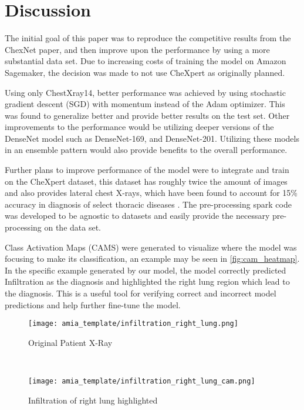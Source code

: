 \documentclass{amia}
\begin{document}
\section*{Discussion}

The initial goal of this paper was to reproduce the competitive results from the ChexNet paper, and then improve upon the performance by using a more substantial data set. Due to increasing costs of training the model on Amazon Sagemaker, the decision was made to not use CheXpert as originally planned.

Using only ChestXray14, better performance was achieved by using stochastic gradient descent (SGD) with momentum instead of the Adam optimizer. This was found to generalize better \cite{ref13} and provide better results on the test set. Other improvements to the performance would be utilizing deeper versions of the DenseNet model such as DenseNet-169, and DenseNet-201. Utilizing these models in an ensemble pattern would also provide benefits to the overall performance.

Further plans to improve performance of the model were to integrate and train on the CheXpert dataset, this dataset has roughly twice the amount of images and also provides lateral chest X-rays, which have been found to account for 15\% accuracy in diagnosis of select thoracic diseases \cite{ref2}. The pre-processing spark code was developed to be agnostic to datasets and easily provide the necessary pre-processing on the data set.

Class Activation Maps (CAMS) were generated to visualize where the model was focusing to make its classification, an example may be seen in \ref{fig:cam_heatmap}. In the specific example generated by our model, the model correctly predicted Infiltration as the diagnosis and highlighted the right lung region which lead to the diagnosis. This is a useful tool for verifying correct and incorrect model predictions and help further fine-tune the model.

\begin{figure*}[t!]
    \centering
    \begin{subfigure}[t]{0.5\textwidth}
        \centering
        \texttt{[image: amia\_template/infiltration\_right\_lung.png]}
        \caption{Original Patient X-Ray}
    \end{subfigure}%
    ~
    \begin{subfigure}[t]{0.5\textwidth}
        \centering
        \texttt{[image: amia\_template/infiltration\_right\_lung\_cam.png]}
        \caption{Infiltration of right lung highlighted}
    \end{subfigure}
    \caption{Patient X-Ray \& CAM Heatmap}
\label{fig:cam_heatmap}
\end{figure*}
\end{document}
